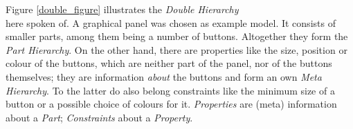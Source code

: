 Figure \ref{double_figure} illustrates the \emph{Double Hierarchy}\\here
spoken of. A graphical panel was chosen as example model. It consists of
smaller parts, among them being a number of buttons. Altogether they form the
\emph{Part Hierarchy}. On the other hand, there are properties like the size,
position or colour of the buttons, which are neither part of the panel, nor of
the buttons themselves; they are information \emph{about} the buttons and form
an own \emph{Meta Hierarchy}. To the latter do also belong constraints like the
minimum size of a button or a possible choice of colours for it.
\emph{Properties} are (meta) information about a \emph{Part};
\emph{Constraints} about a \emph{Property}.
